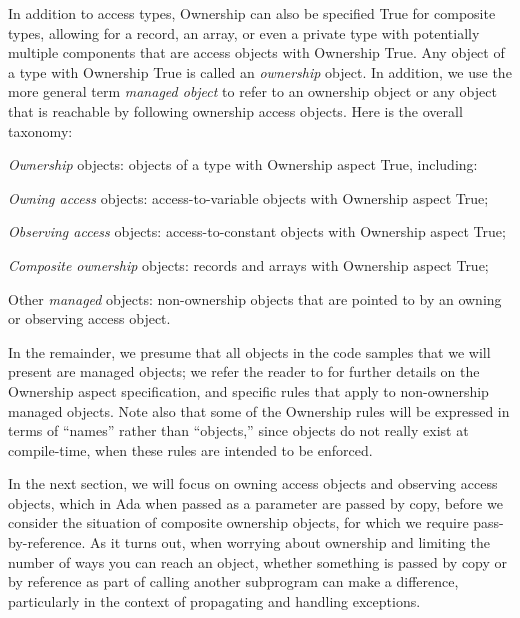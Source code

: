 \documentclass{llncs}
\begin{document}
In addition to access types, Ownership can also be specified True for composite types, allowing for a record, an array, or even a private type with potentially multiple components that are access objects with Ownership True.  Any object of a type with Ownership True is called an \textit{ownership} object.
In addition, we use the more general term \textit{managed object} to refer to an ownership object or any object that is reachable by following ownership access objects.
Here is the overall taxonomy:

\begin{compactitem}
\item \textit{Ownership} objects: objects of a type with Ownership aspect True, including:
    \begin{compactitem}
\item \textit{Owning access} objects: access-to-variable objects with Ownership aspect True;
\item \textit{Observing access} objects: access-to-constant objects with Ownership aspect True;
\item \textit{Composite ownership} objects: records and arrays with Ownership aspect True;
    \end{compactitem}
\item Other \textit{managed} objects: non-ownership objects that are pointed to by an owning or observing access object.
\end{compactitem}


In the remainder, we presume that all objects in the code samples that we will present are managed objects; we refer the reader to \cite{AI2018} for further details on
the Ownership aspect specification, and specific rules that apply to non-ownership managed objects. Note also that some of the Ownership rules will be expressed in terms
of ``names'' rather than ``objects,'' since objects do not really exist at compile-time, when these rules are intended to be enforced. 


In the next section, we will focus on owning access objects and observing access objects, which in Ada when passed as a parameter are passed by copy, before we
consider the situation of composite ownership objects, for which we require pass-by-reference.  As it turns out, when worrying about ownership and limiting the number of ways you can reach an object, whether something is passed by copy or by reference as part of calling another subprogram can make a difference, particularly in the context of propagating and handling exceptions.
\end{document}
